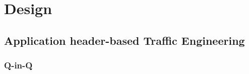 \section{Design}
\label{sec:design}
\subsection{Application header-based Traffic Engineering}
\subsubsection{Q-in-Q}

